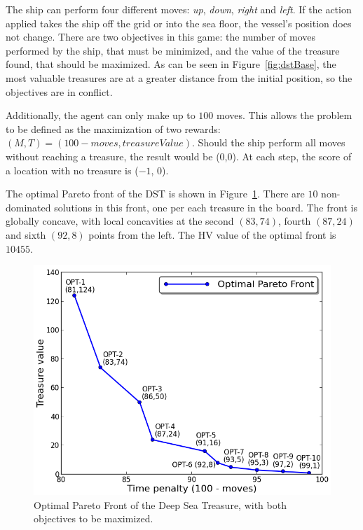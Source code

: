 \documentclass[journal]{IEEEtran}
\begin{document}
The ship can perform four different moves: \textit{up}, \textit{down}, \textit{right}  and \textit{left}. If the action applied takes the ship off the grid or into the sea floor, the vessel's position does not change.  There are two objectives in this game: the number of moves performed by the ship, that must be minimized, and the value of the treasure found, that should be maximized. As can be seen in Figure~\ref{fig:dstBase}, the most valuable treasures are at a greater distance from the initial position, so the objectives are in conflict.

Additionally, the agent can only make up to $100$ moves. This allows the problem to be defined as the maximization of two rewards: $(M,T) = (100 - moves, treasureValue)$. Should the ship perform all moves without reaching a treasure, the result would be ($0$,$0$). At each step, the score of a location with no treasure is ($-1$, $0$).

The optimal Pareto front of the DST is shown in Figure~\ref{fig:optDst}. There are $10$ non-dominated solutions in this front, one per each treasure in the board. The front is globally concave, with local concavities at the second $(83,74)$, fourth $(87,24)$ and sixth $(92,8)$ points from the left. The HV value of the optimal front is $10455$.

\begin{figure}[!t]
\begin{center}
\includegraphics[width=1.0\columnwidth]{img/optDST.png}
\end{center}
\caption{Optimal Pareto Front of the Deep Sea Treasure, with both objectives to be maximized.}
\label{fig:optDst}
\end{figure}
\end{document}
